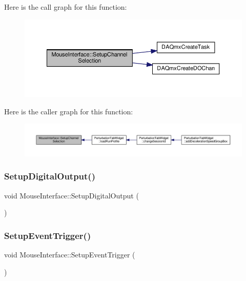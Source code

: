 Here is the call graph for this function\+:
\nopagebreak
\begin{figure}[H]
\begin{center}
\leavevmode
\includegraphics[width=350pt]{class_mouse_interface_a698ae8e0768d1c1cbfc80c0c53ba9dd3_cgraph}
\end{center}
\end{figure}
Here is the caller graph for this function\+:
\nopagebreak
\begin{figure}[H]
\begin{center}
\leavevmode
\includegraphics[width=350pt]{class_mouse_interface_a698ae8e0768d1c1cbfc80c0c53ba9dd3_icgraph}
\end{center}
\end{figure}
\mbox{\label{class_mouse_interface_a2f92521a090ccb91f672f87d80493ec0}} 
\subsubsection{\texorpdfstring{Setup\+Digital\+Output()}{SetupDigitalOutput()}}
{\footnotesize\ttfamily void Mouse\+Interface\+::\+Setup\+Digital\+Output (\begin{DoxyParamCaption}{ }\end{DoxyParamCaption})}

\mbox{\label{class_mouse_interface_a6f60ced71ed9ac307b019cb300e44a32}} 
\subsubsection{\texorpdfstring{Setup\+Event\+Trigger()}{SetupEventTrigger()}}
{\footnotesize\ttfamily void Mouse\+Interface\+::\+Setup\+Event\+Trigger (\begin{DoxyParamCaption}{ }\end{DoxyParamCaption})}



